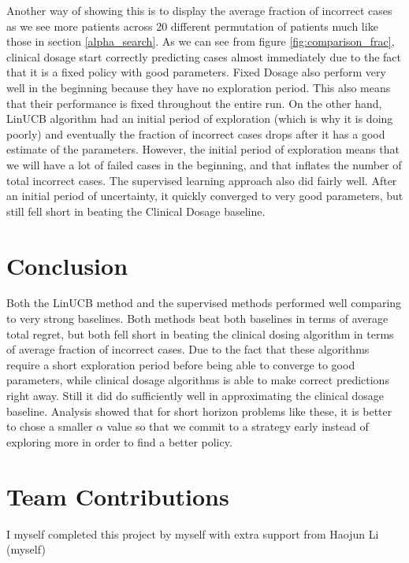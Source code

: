 \documentclass{article}
\begin{document}
Another way of showing this is to display the average fraction of incorrect cases as we see more patients across 20 different permutation of patients much like those in section \ref{alpha_search}. As we can see from figure \ref{fig:comparison_frac}, clinical dosage start correctly predicting cases almost immediately due to the fact that it is a fixed policy with good parameters. Fixed Dosage also perform very well in the beginning because they have no exploration period. This also means that their performance is fixed throughout the entire run. On the other hand, LinUCB algorithm had an initial period of exploration (which is why it is doing poorly) and eventually the fraction of incorrect cases drops after it has a good estimate of the parameters. However, the initial period of exploration means that we will have a lot of failed cases in the beginning, and that inflates the number of total incorrect cases. The supervised learning approach also did fairly well. After an initial period of uncertainty, it quickly converged to very good parameters, but still fell short in beating the Clinical Dosage baseline. 

\section{Conclusion}

Both the LinUCB method and the supervised methods performed well comparing to very strong baselines. Both methods beat both baselines in terms of average total regret, but both fell short in beating the clinical dosing algorithm in terms of average fraction of incorrect cases. Due to the fact that these algorithms require a short exploration period before being able to converge to good parameters, while clinical dosage algorithms is able to make correct predictions right away. Still it did do sufficiently well in approximating the clinical dosage baseline. Analysis showed that for short horizon problems like these, it is better to chose a smaller $\alpha$ value so that we commit to a strategy early instead of exploring more in order to find a better policy.

\section{Team Contributions}
I myself completed this project by myself with extra support from Haojun Li (myself) 




\end{document}
